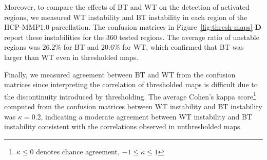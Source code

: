 Moreover, to compare the effects of BT and WT on the detection of activated
regions, we measured WT instability and BT instability in each region of
the HCP-MMP1.0 parcellation. The confusion matrices in
Figure~\ref{fig:thresh-maps}-\textbf{D} report these instabilities for the
360 tested regions. The average ratio of unstable regions was 26.2\% for BT
and 20.6\% for WT, which confirmed that BT was larger than
WT even in thresholded maps.

Finally, we measured agreement between BT and WT from the confusion
matrices since interpreting the correlation of thresholded maps is
difficult due to the discontinuity introduced by thresholding. 
The average Cohen's kappa score\footnote{$\kappa \leq 0$ denotes chance agreement, $-1 \leq \kappa \leq 1$}
computed from the confusion matrices between WT instability and BT instability was $\kappa=0.2$, indicating
a moderate agreement between WT instability and BT instability consistent with the correlations observed in 
unthresholded maps.


